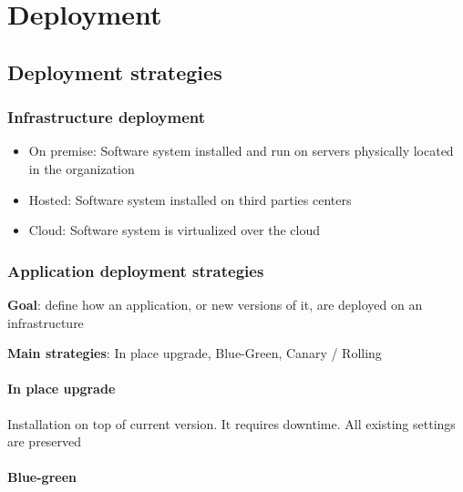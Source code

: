 \chapter{Deployment}

\section{Deployment strategies}

\subsection{Infrastructure deployment}
\begin{itemize}
  \item On premise: Software system installed and run on servers physically located in the
        organization
  \item Hosted: Software system installed on third parties centers
  \item Cloud: Software system is virtualized over the cloud
\end{itemize}


\subsection{Application deployment strategies}

\textbf{Goal}: define how an application, or new versions of it, are deployed
on an infrastructure

\textbf{Main strategies}: In place upgrade, Blue-Green, Canary / Rolling

\subsubsection{In place upgrade}

Installation on top of current version. It requires downtime. All existing settings are preserved


\subsubsection{Blue-green}



